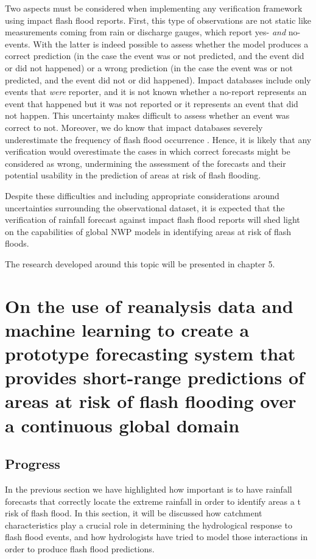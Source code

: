Two aspects must be considered when implementing any verification framework using impact flash flood reports. First, this type of observations are not static like measurements coming from rain or discharge gauges, which report yes- \textit{and} no-events. With the latter is indeed possible to assess whether the model produces a correct prediction (in the case the event was or not predicted, and the event did or did not happened) or a wrong prediction (in the case the event was or not predicted, and the event did not or did happened). Impact databases include only events that \textit{were} reporter, and it is not known whether a no-report represents an event that happened but it was not reported or it represents an event that did not happen. This uncertainty makes difficult to assess whether an event was correct to not. Moreover, we do know that impact databases severely underestimate the frequency of flash flood occurrence \citep{Panwar_2020}. Hence, it is likely that any verification would overestimate the cases in which correct forecasts might be considered as wrong, undermining the assessment of the forecasts and their potential usability in the prediction of areas at risk of flash flooding. 

Despite these difficulties and including appropriate considerations around uncertainties surrounding the observational dataset, it is expected that the verification of rainfall forecast against impact flash flood reports will shed light on the capabilities of global NWP models in identifying areas at risk of flash floods. 

The research developed around this topic will be presented in chapter 5. 


\section{On the use of reanalysis data and machine learning to create a prototype forecasting system that provides short-range predictions of areas at risk of flash flooding over a continuous global domain}

\subsection{Progress}

In the previous section we have highlighted how important is to have rainfall forecasts that correctly locate the extreme rainfall in order to identify areas a t risk of flash flood. In this section, it will be discussed how catchment characteristics play a crucial role in determining the hydrological response to flash flood events, and how hydrologists have tried to model those interactions in order to produce flash flood predictions. 

